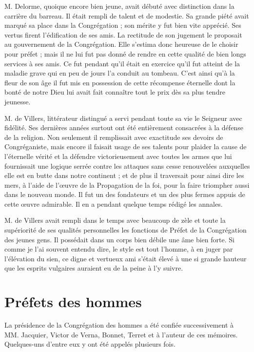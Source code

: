 M. Delorme, quoique encore bien jeune, avait débuté avec distinction dans la carrière du barreau. Il était rempli de talent et de modestie. Sa grande piété avait marqué sa place dans la Congrégation ; son mérite y fut bien vite apprécié. Ses vertus firent l'édification de ses amis. La rectitude de son jugement le proposait au gouvernement de la Congrégation. Elle s'estima donc heureuse de le choisir pour préfet ; mais il ne lui fut pas donné de rendre en cette qualité de bien longs services à ses amis. Ce fut pendant qu'il était en exercice qu'il fut atteint de la maladie grave qui en peu de jours l'a conduit au tombeau. C'est ainsi qu'à la fleur de son âge il fut mis en possession de cette récompense éternelle dont la bonté de notre Dieu lui avait fait connaître tout le prix dès sa plus
tendre jeunesse.

M. de Villers, littérateur distingué a servi pendant toute sa vie le Seigneur avec fidélité. Ses dernières années surtout ont été entièrement consacrées à la défense de la religion. Non seulement il remplissait avec exactitude ses devoirs de Congréganiste, mais encore il faisait usage de ses talents pour plaider la cause de l'éternelle vérité et la défendre victorieusement avec toutes les armes que lui fournissait une logique serrée contre les attaques sans cesse renouvelées auxquelles elle est en butte dans notre continent ; et de plus il traversait pour ainsi dire les mers, à l'aide de l'œuvre de la Propagation de la foi, pour la faire triompher aussi dans le nouveau monde. Il fut un des fondateurs et un des plus fermes appuis de cette œuvre admirable. Il en a pendant quelque temps rédigé les annales.

M. de Villers avait rempli dans le temps avec beaucoup de zèle et toute la supériorité de ses qualités personnelles les fonctions de Préfet de la Congrégation des jeunes gens. Il possédait dans un corps bien débile une âme bien forte. Si comme je l'ai souvent entendu dire, le style est tout l'homme, à en juger par l'élévation du sien, ce digne et vertueux ami s'était élevé à une si grande hauteur que les esprits vulgaires auraient eu de la peine à l'y suivre.

\section*{Préfets des hommes}
La présidence de la Congrégation des hommes a été confiée successivement à MM. Jacquier, Victor de Verna, Bonnet, Terret et à l'auteur de ces mémoires. Quelques-uns d'entre eux y ont été appelés plusieurs fois.

